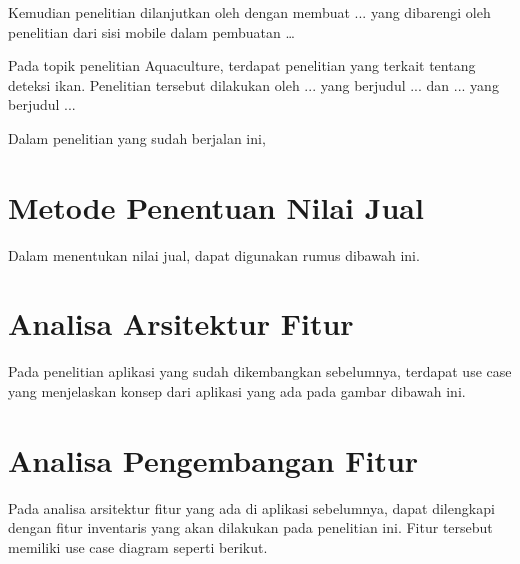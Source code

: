 Kemudian penelitian dilanjutkan oleh \citep{andri2022} dengan membuat ... yang dibarengi oleh penelitian \citep{gian2022} dari sisi mobile dalam pembuatan \dots

Pada topik penelitian Aquaculture, terdapat penelitian yang terkait tentang deteksi ikan. Penelitian tersebut dilakukan oleh ... yang berjudul ... dan ... yang berjudul ...

Dalam penelitian yang sudah berjalan ini, 

\section{Metode Penentuan Nilai Jual}

Dalam menentukan nilai jual, dapat digunakan rumus dibawah ini.

\section{Analisa Arsitektur Fitur}

Pada penelitian aplikasi yang sudah dikembangkan sebelumnya, terdapat use case yang menjelaskan konsep dari aplikasi yang ada pada gambar dibawah ini.


\section{Analisa Pengembangan Fitur}

Pada analisa arsitektur fitur yang ada di aplikasi sebelumnya, dapat dilengkapi dengan fitur inventaris yang akan dilakukan pada penelitian ini. Fitur tersebut memiliki use case diagram seperti berikut.





